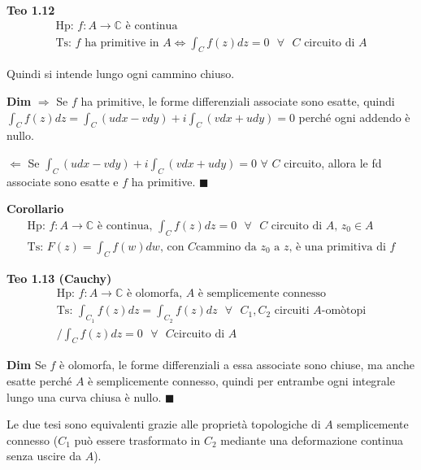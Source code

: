 \documentclass{article}
\begin{document}
\textbf{Teo 1.12}%
\begin{gather*}
\text{Hp: }f:A\rightarrow 
\mathbb{C}
\text{ \`{e} continua} \\
\text{Ts: }f\text{ ha primitive in }A\Longleftrightarrow \int_{C}f\left(
z\right) dz=0\text{ }\forall \text{ }C\text{ circuito di }A
\end{gather*}

Quindi si intende lungo ogni cammino chiuso.

\textbf{Dim }$\Longrightarrow $ Se $f$ ha primitive, le forme differenziali
associate sono esatte, quindi $\int_{C}f\left( z\right) dz=\int_{C}\left(
udx-vdy\right) +i\int_{C}\left( vdx+udy\right) =0$ perch\'{e} ogni addendo 
\`{e} nullo.

$\Longleftarrow $ Se $\int_{C}\left( udx-vdy\right) +i\int_{C}\left(
vdx+udy\right) =0$ $\forall $ $C$ circuito, allora le fd associate sono
esatte e $f$ ha primitive. $\blacksquare $

\textbf{Corollario}%
\begin{gather*}
\text{Hp: }f:A\rightarrow 
\mathbb{C}
\text{ \`{e} continua, }\int_{C}f\left( z\right) dz=0\text{ }\forall \text{ }%
C\text{ circuito di }A\text{, }z_{0}\in A \\
\text{Ts: }F\left( z\right) =\int_{C}f\left( w\right) dw\text{, con }C\text{
cammino da }z_{0}\text{ a }z\text{, \`{e} una primitiva di }f
\end{gather*}

\textbf{Teo 1.13 (Cauchy)}%
\begin{gather*}
\text{Hp: }f:A\rightarrow 
\mathbb{C}
\text{ \`{e} olomorfa, }A\text{ \`{e} semplicemente connesso} \\
\text{Ts: }\int_{C_{1}}f\left( z\right) dz=\int_{C_{2}}f\left( z\right) dz%
\text{ }\forall \text{ }C_{1},C_{2}\text{ circuiti }A\text{-om\`{o}topi} \\
\text{/}\int_{C}f\left( z\right) dz=0\text{ }\forall \text{ }C\text{
circuito di }A
\end{gather*}

\textbf{Dim} Se $f$ \`{e} olomorfa, le forme differenziali a essa associate sono chiuse, ma
anche esatte perch\'{e} $A$ \`{e} semplicemente connesso, quindi per
entrambe ogni integrale lungo una curva chiusa \`{e} nullo. $\blacksquare $

Le due tesi sono equivalenti grazie alle propriet\`{a} topologiche di $A$
semplicemente connesso ($C_{1}$ pu\`{o} essere trasformato in $C_{2}$
mediante una deformazione continua senza uscire da $A$).
\end{document}
